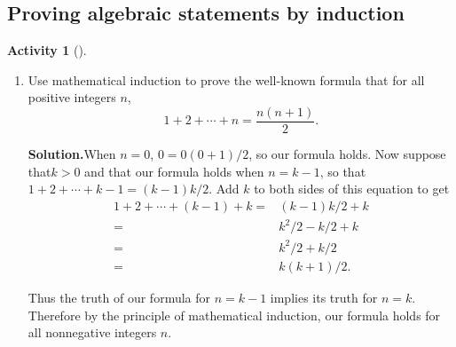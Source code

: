 \documentclass[10pt,]{book}
\theoremstyle{plain}
\theoremstyle{definition}
\newtheorem{activity}[project]{Activity}
\numberwithin{equation}{chapter}
\newcommand{\amp}{&}
\begin{document}
\subsection[{Proving algebraic statements by induction}]{Proving algebraic statements by induction}\label{subsection-75}
\begin{activity}[]\label{activity-332}
~\par
\begin{enumerate}[label=(\alph*)]
 \item Use mathematical induction to prove the well-known formula that for all positive integers \(n\),%
\begin{equation*}
1+2 + \cdots +n = \frac{n(n+1)}{2}.
\end{equation*}
%
\par\medskip\noindent%
\textbf{Solution.}\quad When \(n=0\), \(0=0(0+1)/2\), so our formula holds. Now suppose that\(k>0\) and that our formula holds when \(n=k-1\), so that \(1+2+\cdots+k-1=(k-1)k/2\). Add \(k\) to both sides of this equation to get%
\begin{align*}
1+2+\cdots+(k-1)+k =\amp  (k-1)k/2 +k\\
=\amp  k^2/2-k/2+k\\
=\amp
k^2/2+k/2\\
=\amp k(k+1)/2.
\end{align*}
%
\par
Thus the truth of our formula for \(n=k-1\) implies its truth for \(n=k\). Therefore by the principle of mathematical induction, our formula holds for all nonnegative integers \(n\).%


\end{enumerate}
\end{activity}
\end{document}
